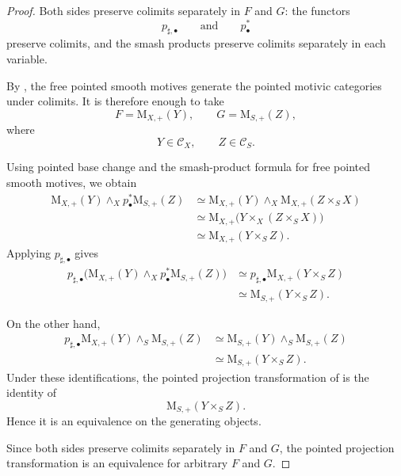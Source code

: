 \begin{proof}
Both sides preserve colimits separately in \(F\) and \(G\):
the functors
\[
    p_{\sharp,\bullet}
    \qquad\text{and}\qquad
    p^*_\bullet
\]
preserve colimits, and the smash products preserve colimits separately
in each variable.

By
,
the free pointed smooth motives generate the pointed motivic categories
under colimits. It is therefore enough to take
\[
    F
    =
    \mathrm M_{X,+}(Y),
    \qquad
    G
    =
    \mathrm M_{S,+}(Z),
\]
where
\[
    Y
    \in
    \mathcal C_X,
    \qquad
    Z
    \in
    \mathcal C_S.
\]

Using pointed base change and the smash-product formula for free pointed
smooth motives, we obtain
\[
\begin{aligned}
    \mathrm M_{X,+}(Y)
    \wedge_X
    p^*_\bullet\mathrm M_{S,+}(Z)
    &\simeq
    \mathrm M_{X,+}(Y)
    \wedge_X
    \mathrm M_{X,+}(Z\times_SX)
    \\
    &\simeq
    \mathrm M_{X,+}
    \bigl(
        Y\times_X(Z\times_SX)
    \bigr)
    \\
    &\simeq
    \mathrm M_{X,+}(Y\times_SZ).
\end{aligned}
\]
Applying \(p_{\sharp,\bullet}\) gives
\[
\begin{aligned}
    p_{\sharp,\bullet}
    \bigl(
        \mathrm M_{X,+}(Y)
        \wedge_X
        p^*_\bullet\mathrm M_{S,+}(Z)
    \bigr)
    &\simeq
    p_{\sharp,\bullet}
    \mathrm M_{X,+}(Y\times_SZ)
    \\
    &\simeq
    \mathrm M_{S,+}(Y\times_SZ).
\end{aligned}
\]

On the other hand,
\[
\begin{aligned}
    p_{\sharp,\bullet}\mathrm M_{X,+}(Y)
    \wedge_S
    \mathrm M_{S,+}(Z)
    &\simeq
    \mathrm M_{S,+}(Y)
    \wedge_S
    \mathrm M_{S,+}(Z)
    \\
    &\simeq
    \mathrm M_{S,+}(Y\times_SZ).
\end{aligned}
\]
Under these identifications, the pointed projection transformation of
is the identity of
\[
    \mathrm M_{S,+}(Y\times_SZ).
\]
Hence it is an equivalence on the generating objects.

Since both sides preserve colimits separately in \(F\) and \(G\), the
pointed projection transformation is an equivalence for arbitrary
\(F\) and \(G\).
\end{proof}

